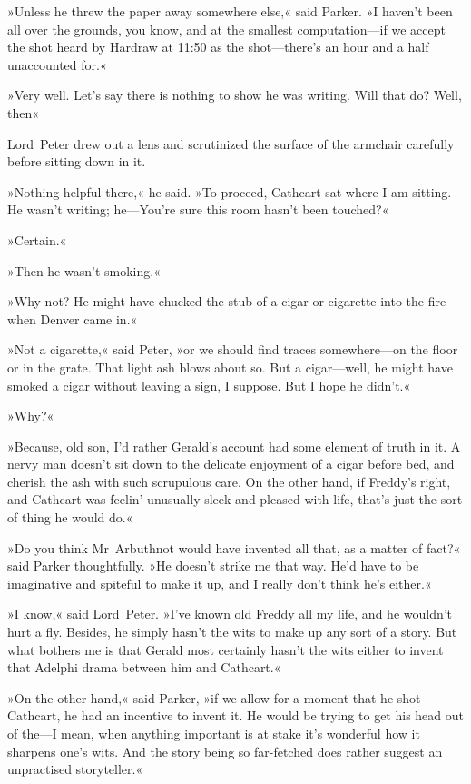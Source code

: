 »Unless he threw the paper away somewhere else,« said Parker. »I haven't been all over the grounds, you know, and at the smallest computation—if we accept the shot heard by Hardraw at 11:50 as the shot—there's an hour and a half unaccounted for.«

»Very well. Let's say there is nothing to show he was writing. Will that do? Well, then\longdash«

Lord~Peter drew out a lens and scrutinized the surface of the armchair carefully before sitting down in it.

»Nothing helpful there,« he said. »To proceed, Cathcart sat where I am sitting. He wasn't writing; he—You're sure this room hasn't been touched?«

»Certain.«

»Then he wasn't smoking.«

»Why not? He might have chucked the stub of a cigar or cigarette into the fire when Denver came in.«

»Not a cigarette,« said Peter, »or we should find traces somewhere—on the floor or in the grate. That light ash blows about so. But a cigar—well, he might have smoked a cigar without leaving a sign, I suppose. But I hope he didn't.«

»Why?«

»Because, old son, I'd rather Gerald's account had some element of truth in it. A nervy man doesn't sit down to the delicate enjoyment of a cigar before bed, and cherish the ash with such scrupulous care. On the other hand, if Freddy's right, and Cathcart was feelin' unusually sleek and pleased with life, that's just the sort of thing he would do.«

»Do you think Mr~Arbuthnot would have invented all that, as a matter of fact?« said Parker thoughtfully. »He doesn't strike me that way. He'd have to be imaginative and spiteful to make it up, and I really don't think he's either.«

»I know,« said Lord~Peter. »I've known old Freddy all my life, and he wouldn't hurt a fly. Besides, he simply hasn't the wits to make up any sort of a story. But what bothers me is that Gerald most certainly hasn't the wits either to invent that Adelphi drama between him and Cathcart.«

»On the other hand,« said Parker, »if we allow for a moment that he shot Cathcart, he had an incentive to invent it. He would be trying to get his head out of the—I mean, when anything important is at stake it's wonderful how it sharpens one's wits. And the story being so far-fetched does rather suggest an unpractised storyteller.«

